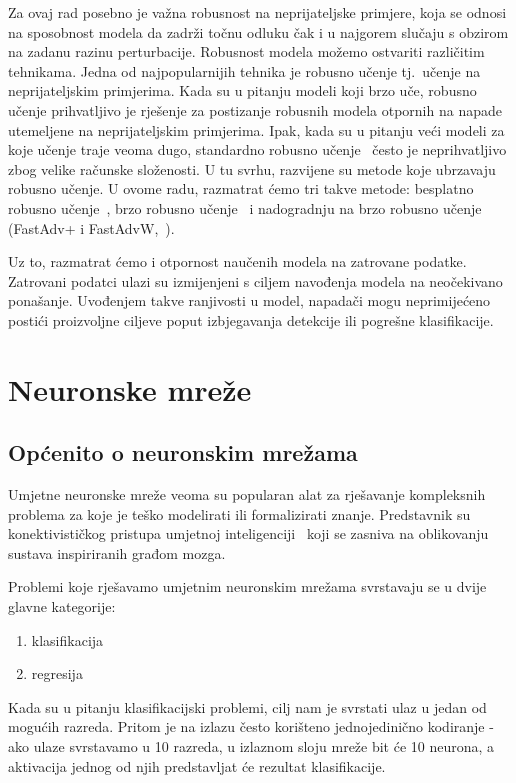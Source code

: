 \documentclass[times, utf8, zavrsni, numeric]{fer}
\begin{document}
Za ovaj rad posebno je važna robusnost na neprijateljske primjere, koja se odnosi na sposobnost modela da zadrži točnu odluku čak i u najgorem slučaju s obzirom na zadanu razinu perturbacije.
Robusnost modela možemo ostvariti različitim tehnikama. Jedna od najpopularnijih tehnika je robusno učenje tj.\ učenje na neprijateljskim primjerima. 
Kada su u pitanju modeli koji brzo uče, robusno učenje prihvatljivo je rješenje za postizanje robusnih modela otpornih na napade utemeljene na neprijateljskim primjerima. 
Ipak, kada su u pitanju veći modeli za koje učenje traje veoma dugo, standardno robusno učenje~\cite{madry2017towards} često je neprihvatljivo zbog velike računske složenosti. 
U tu svrhu, razvijene su metode koje ubrzavaju robusno učenje. U ovome radu, razmatrat ćemo tri takve metode: besplatno robusno učenje~\cite{shafahi2019adversarial}, brzo robusno učenje~\cite{wong2020fast} i
nadogradnju na brzo robusno učenje (FastAdv+ i FastAdvW,~\cite{li2020towards}). 

\pagebreak

Uz to, razmatrat ćemo i otpornost naučenih modela na zatrovane podatke. Zatrovani podatci ulazi su izmijenjeni s ciljem navođenja modela na neočekivano ponašanje. 
Uvođenjem takve ranjivosti u model, napadači mogu neprimijećeno postići proizvoljne ciljeve poput izbjegavanja detekcije ili pogrešne klasifikacije.

\chapter{Neuronske mreže}
\section{Općenito o neuronskim mrežama}
Umjetne neuronske mreže veoma su popularan alat za rješavanje kompleksnih problema za koje je teško modelirati ili formalizirati znanje. 
Predstavnik su konektivističkog pristupa umjetnoj inteligenciji~\cite{uui2020} koji se zasniva na oblikovanju sustava inspiriranih građom mozga.

Problemi koje rješavamo umjetnim neuronskim mrežama svrstavaju se u dvije glavne kategorije:
\begin{enumerate}
    \item klasifikacija 
    \item regresija
\end{enumerate}

Kada su u pitanju klasifikacijski problemi, cilj nam je svrstati ulaz u jedan od mogućih razreda. 
Pritom je na izlazu često korišteno jednojedinično kodiranje - ako ulaze svrstavamo u 10 razreda, u izlaznom sloju mreže bit će 10 neurona, a aktivacija jednog od njih predstavljat će rezultat klasifikacije.
\end{document}
